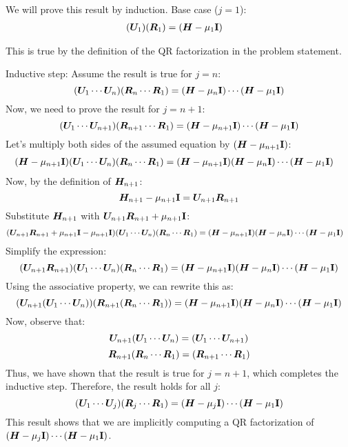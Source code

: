 \documentclass[twoside,10pt]{article}
\begin{document}
\quad We will prove this result by induction.
Base case ($j = 1$):
\begin{align*}
\left(\mtx{U}_1\right)\left(\mtx{R}_1\right) &= \left(\mtx{H} - \mu_1 \Id\right)
\end{align*}

This is true by the definition of the QR factorization in the problem statement.

Inductive step:
Assume the result is true for $j = n$:
$$\left(\mtx{U}_1 \cdots \mtx{U}_n\right)\left(\mtx{R}_n \cdots \mtx{R}_1\right) = \left(\mtx{H} - \mu_{n} \Id\right) \cdots \left(\mtx{H} - \mu_1 \Id\right)$$
Now, we need to prove the result for $j = n + 1$:
$$\left(\mtx{U}_1 \cdots \mtx{U}_{n+1}\right)\left(\mtx{R}_{n+1} \cdots \mtx{R}_1\right) = \left(\mtx{H} - \mu_{n+1} \Id\right) \cdots \left(\mtx{H} - \mu_1 \Id\right)$$
Let's multiply both sides of the assumed equation by $\left(\mtx{H} - \mu_{n+1} \Id\right)$:
\begin{align*}
\left(\mtx{H} - \mu_{n+1} \Id\right)\left(\mtx{U}_1 \cdots \mtx{U}_n\right)\left(\mtx{R}_n \cdots \mtx{R}_1\right) &= \left(\mtx{H} - \mu_{n+1} \Id\right)\left(\mtx{H} - \mu_{n} \Id\right) \cdots \left(\mtx{H} - \mu_1 \Id\right)
\end{align*}
Now, by the definition of $\bm{H}_{n+1}$:
$$\bm{H}_{n+1} - \mu_{n+1} \mathbf{I} = \bm{U}_{n+1} \bm{R}_{n+1}$$
Substitute $\bm{H}_{n+1}$ with $\bm{U}_{n+1} \bm{R}_{n+1} + \mu_{n+1} \mathbf{I}$:
\begin{align*}
\left(\mtx{U}_{n+1} \mtx{R}_{n+1} + \mu_{n+1} \Id - \mu_{n+1} \Id\right)\left(\mtx{U}_1 \cdots \mtx{U}_n\right)\left(\mtx{R}_n \cdots \mtx{R}_1\right) &= \left(\mtx{H} - \mu_{n+1} \Id\right)\left(\mtx{H} - \mu_{n} \Id\right) \cdots \left(\mtx{H} - \mu_1 \Id\right)
\end{align*}
Simplify the expression:
$$\left(\mtx{U}_{n+1} \mtx{R}_{n+1}\right)\left(\mtx{U}_1 \cdots \mtx{U}_n\right)\left(\mtx{R}_n \cdots \mtx{R}_1\right) = \left(\mtx{H} - \mu_{n+1} \Id\right)\left(\mtx{H} - \mu_{n} \Id\right) \cdots \left(\mtx{H} - \mu_1 \Id\right)$$
Using the associative property, we can rewrite this as:
$$\left(\mtx{U}_{n+1}\left(\mtx{U}_1 \cdots \mtx{U}_n\right)\right)\left(\mtx{R}_{n+1}\left(\mtx{R}_n \cdots \mtx{R}_1\right)\right) = \left(\mtx{H} - \mu_{n+1} \Id\right)\left(\mtx{H} - \mu_{n} \Id\right) \cdots \left(\mtx{H} - \mu_1 \Id\right)$$
Now, observe that:
$$\mtx{U}_{n+1}\left(\mtx{U}_1 \cdots \mtx{U}_n\right) = \left(\mtx{U}_1 \cdots \mtx{U}_{n+1}\right)$$
$$\mtx{R}_{n+1}\left(\mtx{R}_n \cdots \mtx{R}_1\right) = \left(\mtx{R}_{n+1} \cdots \mtx{R}_1\right)$$
Thus, we have shown that the result is true for $j = n + 1$, which completes the inductive step. Therefore, the result holds for all $j$:
$$\left(\mtx{U}_1 \cdots \mtx{U}_j\right)\left(\mtx{R}_j \cdots \mtx{R}_1\right) = \left(\mtx{H} - \mu_{j} \Id\right) \cdots \left(\mtx{H} - \mu_1 \Id\right)$$
This result shows that we are implicitly computing a QR factorization of $\left(\mtx{H} - \mu_j \Id\right) \cdots \left(\mtx{H} - \mu_1 \Id\right)$.
\end{document}
